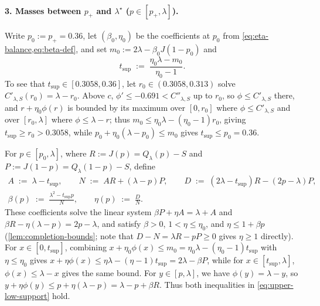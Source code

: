 \documentclass[11pt]{article}
\numberwithin{equation}{section}
\theoremstyle{plain}
\theoremstyle{definition}
\newcommand{\1}{\mathbf{1}}
\begin{document}
\paragraph{3. Masses between $p_+$ and $\lambda^\star$ ($p \in [p_+, \lambda]$).}
Write $p_0 := p_+ = 0.36$, let $(\beta_0, \eta_0)$ be the coefficients at $p_0$ from \cref{eq:eta-balance,eq:beta-def}, and set $m_0 := 2\lambda - \beta_0 J(1 - p_0)$ and
\[
  t_{\mathrm{sup}} \;:=\; \frac{\eta_0\lambda - m_0}{\eta_0 - 1}.
\]
To see that $t_{\mathrm{sup}} \in [0.3058, 0.36]$, let $r_0 \in (0.3058, 0.313)$ solve $C'_{\lambda, S}(r_0) = \lambda - r_0$. Above $c$, $\phi' \le -0.691 < C''_{\lambda, S}$ up to $r_0$, so $\phi \le C'_{\lambda, S}$ there, and $r + \eta_0\phi(r)$ is bounded by its maximum over $[0, r_0]$ where $\phi \le C'_{\lambda, S}$ and over $[r_0, \lambda]$ where $\phi \le \lambda - r$; thus $m_0 \le \eta_0\lambda - (\eta_0 - 1)r_0$, giving $t_{\mathrm{sup}} \ge r_0 > 0.3058$, while $p_0 + \eta_0(\lambda - p_0) \le m_0$ gives $t_{\mathrm{sup}} \le p_0 = 0.36$.

For $p \in [p_0, \lambda]$, where $R := J(p) = Q_\lambda(p) - S$ and $P := J(1 - p) = Q_\lambda(1 - p) - S$, define
\begin{equation}
  \begin{gathered}
    A \;:=\; \lambda - t_{\mathrm{sup}}, \qquad N \;:=\; A R + (\lambda - p)P, \qquad D \;:=\; (2\lambda - t_{\mathrm{sup}})R - (2p - \lambda)P, \\
    \beta(p) \;:=\; \frac{\lambda^2 - t_{\mathrm{sup}} p}{N}, \qquad \eta(p) \;:=\; \frac{D}{N}.
  \end{gathered}
  \label{eq:transport-middle}
\end{equation}
These coefficients solve the linear system $\beta P + \eta A = \lambda + A$ and $\beta R - \eta(\lambda - p) = 2p - \lambda$, and satisfy $\beta > 0$, $1 < \eta \le \eta_0$, and $\eta \le 1 + \beta p$ (\cref{lem:completion-bounds}; note that $D - N = \lambda R - p P \ge 0$ gives $\eta \ge 1$ directly). For $x \in [0, t_{\mathrm{sup}}]$, combining $x + \eta_0\phi(x) \le m_0 = \eta_0\lambda - (\eta_0 - 1)t_{\mathrm{sup}}$ with $\eta \le \eta_0$ gives $x + \eta\phi(x) \le \eta\lambda - (\eta - 1)t_{\mathrm{sup}} = 2\lambda - \beta P$, while for $x \in [t_{\mathrm{sup}}, \lambda]$, $\phi(x) \le \lambda - x$ gives the same bound. For $y \in [p, \lambda]$, we have $\phi(y) = \lambda - y$, so $y + \eta\phi(y) \le p + \eta(\lambda - p) = \lambda - p + \beta R$. Thus both inequalities in \cref{eq:upper-low-support} hold.
\end{document}
